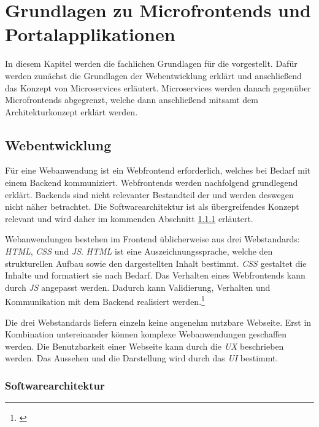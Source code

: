 \section{Grundlagen zu Microfrontends und Portalapplikationen}\label{sec:Grundlagen}

In diesem Kapitel werden die fachlichen Grundlagen für die \dokumententyp{} vorgestellt. Dafür werden zunächst die Grundlagen der Webentwicklung erklärt und anschließend das Konzept von Microservices erläutert. Microservices werden danach gegenüber Microfrontends abgegrenzt, welche dann anschließend mitsamt dem Architekturkonzept erklärt werden.

\subsection{Webentwicklung}\label{sec:Webentwicklung}

Für eine Webanwendung ist ein Webfrontend erforderlich, welches bei Bedarf mit einem Backend kommuniziert. Webfrontends werden nachfolgend grundlegend erklärt. Backends sind nicht relevanter Bestandteil der \dokumententyp{} und werden deswegen nicht näher betrachtet. Die Softwarearchitektur ist als übergreifendes Konzept relevant und wird daher im kommenden Abschnitt \ref{sec:SoftwareArchitektur} erläutert.

Webanwendungen bestehen im Frontend üblicherweise aus drei Webstandards: \textit{\gls{HTML}}, \textit{\gls{CSS}} und \textit{\gls{JS}}. \textit{\gls{HTML}} ist eine Auszeichnungssprache, welche den strukturellen Aufbau sowie den dargestellten Inhalt bestimmt. \textit{\gls{CSS}} gestaltet die Inhalte und formatiert sie nach Bedarf. Das Verhalten eines Webfrontends kann durch \textit{\gls{JS}} angepasst werden. Dadurch kann Validierung, Verhalten und Kommunikation mit dem Backend realisiert werden.\footnote{\cite[vgl.][]{Erni2020}}

Die drei Webstandards liefern einzeln keine angenehm nutzbare Webseite. Erst in Kombination untereinander können komplexe Webanwendungen geschaffen werden. Die Benutzbarkeit einer Webseite kann durch die \textit{\gls{UX}} beschrieben werden. Das Aussehen und die Darstellung wird durch das \textit{\gls{UI}} bestimmt.

\subsubsection{Softwarearchitektur}\label{sec:SoftwareArchitektur}

